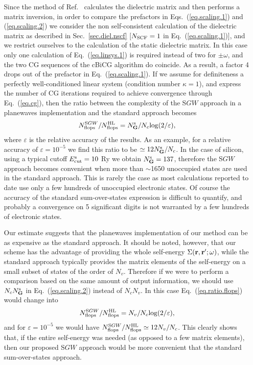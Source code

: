 \documentclass[twocolumn,prb,showpacs,superscriptaddress]{revtex4}
\def\w{\omega}
\def\G{{\bf G}}
\def\r{{\bf r}}
\def\rp{{\bf r^\prime}}
\begin{document}
Since the method of Ref.\  calculates the dielectric matrix and then performs a matrix inversion,
in order to compare the prefactors in Eqs.\ (\ref{eq.scaling.1}) and (\ref{eq.scaling.2})
we consider the non self-consistent calculation of the dielectric matrix as described in Sec.\ \ref{sec.diel.nscf}
[$N_{\rm SCF}=1$ in Eq.\ (\ref{eq.scaling.1})], and we restrict ourselves to 
the calculation of the static dielectric matrix.
In this case only one calculation of Eq.\ (\ref{eq.linsys.1}) is required instead of two for $\pm\w$, 
and the two CG sequences of the cBiCG algorithm do coincide.
As a result, a factor 4 drops out of the prefactor in Eq.\ (\ref{eq.scaling.1}).
If we assume for definiteness a perfectly well-conditioned linear system (condition number $\kappa=1$),
and express the number of CG iterations required to achieve convergence through Eq.\ (\ref{eq.cg}),
then the ratio between the complexity of the S$GW$ approach in a planewaves
implementation and the standard approach becomes
   \begin{equation}\label{eq.ratio.flops}
   N^{{\rm S}GW}_{\rm flops}/N^{\rm HL}_{\rm flops} = N_\G^{\rm s}/N_c {\rm log}(2/\varepsilon),
   \end{equation}
where $\varepsilon$ is the relative accuracy of the results.
As an example, for a relative accuracy of $\varepsilon=10^{-5}$ 
we find this ratio to be $\simeq 12 N_\G^{\rm s}/N_c$.
In the case of silicon, using a typical cutoff $E_{\rm cut}^{\rm s}=10$ Ry we obtain $N_\G^{\rm s}=137$, therefore
the S$GW$ approach becomes convenient when more than $\sim$1650 unoccupied states are used
in the standard approach.
This is rarely the case as most calculations reported to date use only a few hundreds of 
unoccupied electronic states.
Of course the accuracy of the standard sum-over-states expression is difficult to
quantify, and probably a convergence on 5 significant digits is not warranted by a few
hundreds of electronic states. 

Our estimate suggests that the planewaves implementation of our method
can be as expensive as the standard approach.
It should be noted, however, that our scheme has the advantage of providing
the whole self-energy $\Sigma(\r,\rp;\w)$, while the standard approach 
typically provides the matrix elements of the self-energy on a small subset of states of the order of $N_v$. 
Therefore if we were to perform a comparison based on the
same amount of output information, we should use $N_c N_\G^{\rm s}$ in Eq.\ (\ref{eq.scaling.2})
instead of $N_c N_v$. In this case Eq.\ (\ref{eq.ratio.flops}) would change into
  \begin{equation}
  N^{{\rm S}GW}_{\rm flops}/N^{\rm HL}_{\rm flops} = N_v /N_c{\rm log}(2/\varepsilon),
  \end{equation}
and for $\varepsilon=10^{-5}$ we would have $N^{{\rm S}GW}_{\rm flops}/N^{\rm HL}_{\rm flops}\simeq 12 N_v/N_c$.
This clearly shows that, if the entire self-energy was needed (as opposed to a few matrix elements),
then our proposed S$GW$ approach would be more convenient that the standard sum-over-states
approach.
\end{document}
